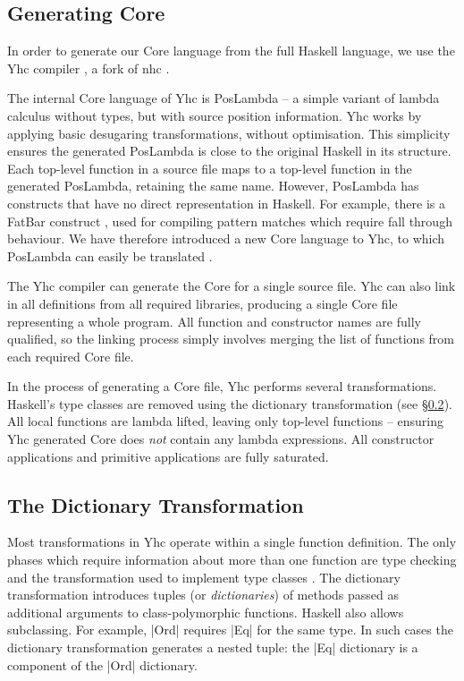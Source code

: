 \subsection{Generating Core}

In order to generate our Core language from the full Haskell language, we use the Yhc compiler \cite{yhc}, a fork of nhc \cite{nhc}.

The internal Core language of Yhc is PosLambda -- a simple variant of lambda calculus without types, but with source position information. Yhc works by applying basic desugaring transformations, without optimisation. This simplicity ensures the generated PosLambda is close to the original Haskell in its structure. Each top-level function in a source file maps to a top-level function in the generated PosLambda, retaining the same name. However, PosLambda has constructs that have no direct representation in Haskell. For example, there is a FatBar construct \cite{spj:implementation}, used for compiling pattern matches which require fall through behaviour. We have therefore introduced a new Core language to Yhc, to which PosLambda can easily be translated \cite{me:yhc_core}.

The Yhc compiler can generate the Core for a single source file. Yhc can also link in all definitions from all required libraries, producing a single Core file representing a whole program. All function and constructor names are fully qualified, so the linking process simply involves merging the list of functions from each required Core file.

In the process of generating a Core file, Yhc performs several transformations. Haskell's type classes are removed using the dictionary transformation (see \S\ref{sec:dictionary_transformation}). All local functions are lambda lifted, leaving only top-level functions -- ensuring Yhc generated Core does \textit{not} contain any lambda expressions. All constructor applications and primitive applications are fully saturated.


\subsection{The Dictionary Transformation}
\label{sec:dictionary_transformation}

Most transformations in Yhc operate within a single function definition. The only phases which require information about more than one function are type checking and the transformation used to implement type classes \citep{wadler:type_classes}. The dictionary transformation introduces tuples (or \textit{dictionaries}) of methods passed as additional arguments to class-polymorphic functions. Haskell also allows subclassing. For example, |Ord| requires |Eq| for the same type. In such cases the dictionary transformation generates a nested tuple: the |Eq| dictionary is a component of the |Ord| dictionary.

